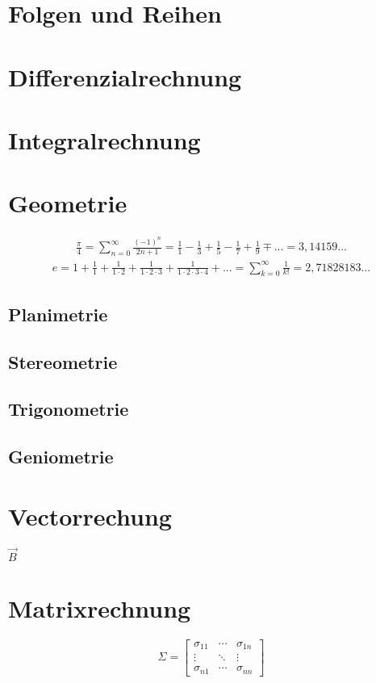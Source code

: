 \documentclass[12pt,a4paper,fleqn,twoside,pdf,final]{article}
\begin{document}
\section{Folgen und Reihen}
\section{Differenzialrechnung}
\section{Integralrechnung}
\section{Geometrie}
\begin{align*} 
\frac{\pi}{4}  =  \sum_{n=0}^\infty  \frac{(-1)^n}{2n+1} = \frac{1}{1} -  \frac{1}{3} +  \frac{1}{5} -  \frac{1}{7} + \frac{1}{9} \mp ... = 3,14159...
\end{align*}
\begin{align*} 
e = 1 + \frac{1}{1}+\frac{1}{1 \cdot 2}+\frac{1}{1 \cdot 2  \cdot 3}+\frac{1}{1 \cdot 2  \cdot 3  \cdot 4}+... = \sum_{k=0}^\infty \frac{1}{k!} = 2,71828183...
\end{align*}



\subsection{Planimetrie}
\subsection{Stereometrie}
\subsection{Trigonometrie}
\subsection{Geniometrie}
\section{Vectorrechung}
$\vec{B}$
\section{Matrixrechnung}

 
 $$
\Sigma=\left[
\begin{array}{ccc}
   \sigma_{11} & \cdots & \sigma_{1n} \\
   \vdots & \ddots & \vdots \\
   \sigma_{n1} & \cdots & \sigma_{nn}
\end{array}
\right]
$$
\end{document}
